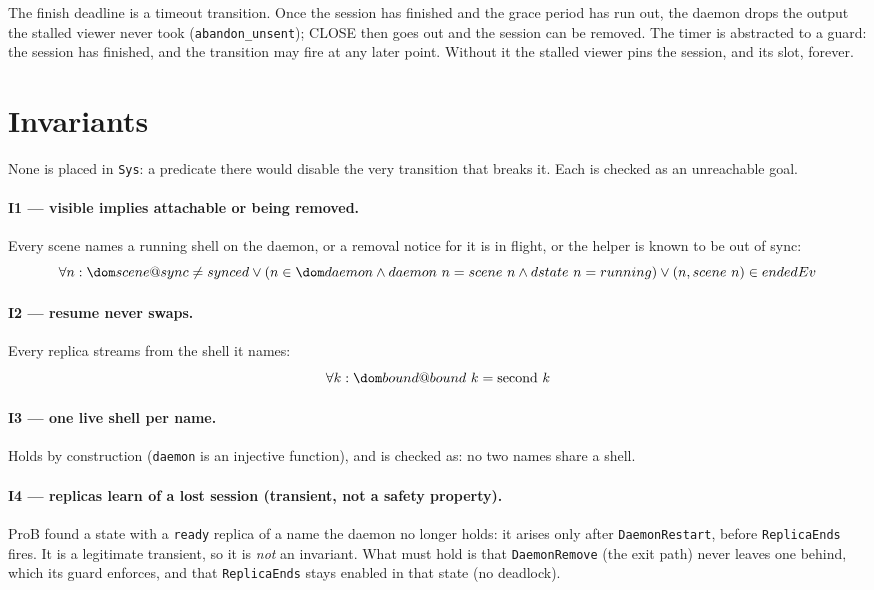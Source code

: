 \documentclass[a4paper,10pt,fleqn]{article}
\begin{document}
The finish deadline is a timeout transition.  Once the session has
finished and the grace period has run out, the daemon drops the output the
stalled viewer never took (\texttt{abandon\_unsent}); CLOSE then goes out and
the session can be removed.  The timer is abstracted to a guard: the session
has finished, and the transition may fire at any later point.  Without it
the stalled viewer pins the session, and its slot, forever.

\section{Invariants}
\label{sec:inv}

None is placed in \texttt{Sys}: a predicate there would disable the very
transition that breaks it.  Each is checked as an unreachable goal.

\paragraph{I1 --- visible implies attachable or being removed.}
Every scene names a running shell on the daemon, or a removal notice for
it is in flight, or the helper is known to be out of sync:
\[
  \forall n : \dom scene @ sync \neq synced \lor
    (n \in \dom daemon \land daemon~n = scene~n \land dstate~n = running)
    \lor (n , scene~n) \in endedEv
\]

\paragraph{I2 --- resume never swaps.}
Every replica streams from the shell it names:
\[
  \forall k : \dom bound @ bound~k = \mathrm{second}~k
\]

\paragraph{I3 --- one live shell per name.}
Holds by construction (\texttt{daemon} is an injective function), and is
checked as: no two names share a shell.

\paragraph{I4 --- replicas learn of a lost session (transient, not a safety property).}
ProB found a state with a \texttt{ready} replica of a name the daemon
no longer holds: it arises only after \texttt{DaemonRestart}, before
\texttt{ReplicaEnds} fires.  It is a legitimate transient, so it is
\emph{not} an invariant.  What must hold is that \texttt{DaemonRemove}
(the exit path) never leaves one behind, which its guard enforces, and
that \texttt{ReplicaEnds} stays enabled in that state (no deadlock).
\end{document}
